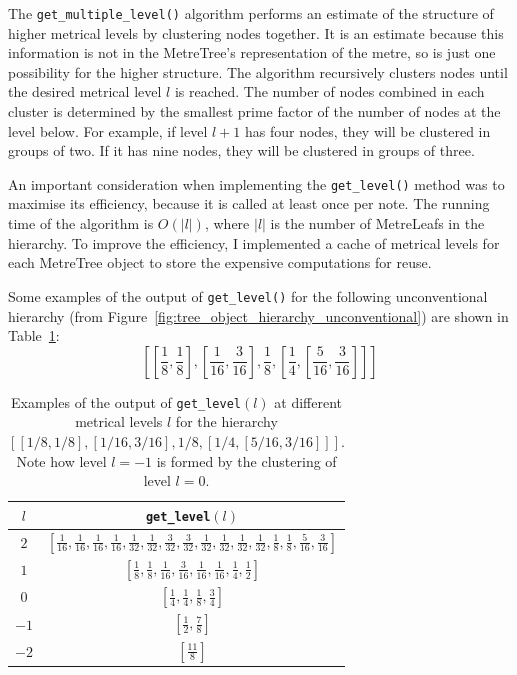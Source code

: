 \documentclass[12pt,twoside,openright]{report}
\begin{document}
The \verb'get_multiple_level()' algorithm performs an estimate of the structure of
higher metrical levels by clustering nodes together. It is an estimate because this information is not in the
MetreTree's representation of the metre, so is just one possibility for the higher structure. The algorithm recursively clusters nodes until
the desired metrical level $l$ is reached. The number of nodes combined in each cluster is
determined by the smallest prime factor of the number of nodes at the level below. For
example, if level $l+1$ has four nodes, they will be clustered in groups of two. If it
has nine nodes, they will be clustered in groups of three.

An important consideration when implementing the \verb'get_level()' method was to
maximise its efficiency, because it is called at least once per note. The
running time of the algorithm is $O(\left\lvert l\right\rvert)$, where $\left\lvert l\right\rvert$ is the number of MetreLeafs in the
hierarchy. To improve the efficiency, I implemented a cache of metrical levels for each
MetreTree object to store the expensive computations for reuse.

Some examples of the output of \verb'get_level()' for the following unconventional hierarchy (from Figure~\ref{fig:tree_object_hierarchy_unconventional}) are shown in Table~\ref{table:get_level}:
\[
    \left[
        \left[\frac{1}{8},\frac{1}{8}\right],
        \left[\frac{1}{16},\frac{3}{16}\right],
        \frac{1}{8},
        \left[\frac{1}{4},\left[\frac{5}{16},\frac{3}{16}\right]\right]
    \right]
\]

\begin{table}[ht]
    \centering
    \renewcommand{\arraystretch}{2.0}
    \begin{tabular}{|c|c|}
        \hline
        $l$     & \verb'get_level'$(l)$ \\
        \hline
        $2$     & $\displaystyle \left[ \frac{1}{16},\frac{1}{16},\frac{1}{16},\frac{1}{16},\frac{1}{32},\frac{1}{32},\frac{3}{32},\frac{3}{32},\frac{1}{32},\frac{1}{32},\frac{1}{32},\frac{1}{32},\frac{1}{8},\frac{1}{8},\frac{5}{16},\frac{3}{16} \right]$ \\
        $1$     & $\displaystyle \left[ \frac{1}{8},\frac{1}{8},\frac{1}{16},\frac{3}{16},\frac{1}{16},\frac{1}{16},\frac{1}{4},\frac{1}{2} \right]$ \\
        $0$     & $\displaystyle \left[ \frac{1}{4},\frac{1}{4},\frac{1}{8},\frac{3}{4} \right]$ \\
        $-1$    & $\displaystyle \left[ \frac{1}{2},\frac{7}{8} \right]$ \\
        $-2$    & $\displaystyle \left[ \frac{11}{8} \right]$ \\ [1ex]
        \hline
    \end{tabular}
    \renewcommand{\arraystretch}{1.0}
    \cprotect\caption{Examples of the output of \verb'get_level'$(l)$ at different metrical levels $l$ for the hierarchy $[[1/8,1/8],[1/16,3/16],1/8,[1/4,[5/16,3/16]]]$. Note how level $l=-1$ is formed by the clustering of level $l=0$.}
    \label{table:get_level}
\end{table}
\end{document}
